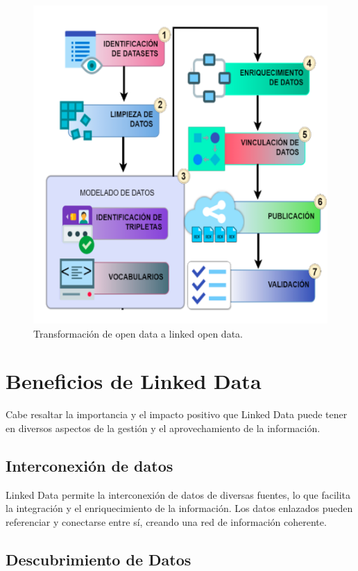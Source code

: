 \documentclass[11pt]{report}
\begin{document}
		\begin{figure}[H]
			\centering
			\includegraphics[scale=0.09]{../img/od-lod1.png} %
			\caption{Transformación de open data a linked open data.}
			\label{fig:od->lod}
		\end{figure}
\chapter{Beneficios de Linked Data}
Cabe resaltar la importancia y el impacto positivo que Linked Data puede tener en diversos aspectos de la gestión y el aprovechamiento de la información.
\section{Interconexión de datos}

		Linked Data permite la interconexión de datos de diversas fuentes, lo que facilita la integración y el enriquecimiento de la información. Los datos enlazados pueden referenciar y conectarse entre sí, creando una red de información coherente.
\section{Descubrimiento de Datos}
\end{document}

